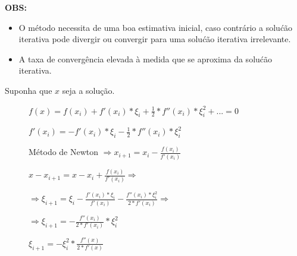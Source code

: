 \noindent
\textbf{OBS:}

\begin{itemize}
 \item O m\'etodo necessita de uma boa estimativa inicial, caso contr\'ario a solu\'c\~ao iterativa pode divergir ou convergir para uma solu\'c\~ao iterativa irrelevante.

 \item A taxa de converg\^encia elevada \`a  medida que se aproxima da solu\'c\~ao iterativa.
\end{itemize}

Suponha que $x$ seja a solução.

\begin{description}
\item[] $f(x) = f(x_{i}) + f'(x_{i}) \ast \xi_{i} + \displaystyle \frac{1}{2} \ast f''(x_{i}) \ast \xi_{i}^{2} + ... = 0$

\item[] $f'(x_{i}) = - f'(x_{i}) \ast \xi_{i} - \displaystyle \frac{1}{2} \ast f''(x_{i}) \ast \xi_{i}^{2}$

\item[] Método de Newton $\displaystyle \Rightarrow x_{i+1} = x_{i} - \frac{f(x_{i})}{f'(x_{i})} $

\item[] $\displaystyle x - x_{i+1} = x - x_{i} + \frac{f(x_{i})}{f'(x_{i})} \Rightarrow$

\item[] $\displaystyle  \Rightarrow \xi_{i+1} = \xi_{i} - \frac{f'(x_{i}) \ast \xi_{i}}{f'(x_{i})} - \frac{f''(x_{i}) \ast \xi_{i}^{2}}{2 \ast f'(x_{i})} \Rightarrow$

\item[] $\displaystyle \Rightarrow \xi_{i+1} = - \frac{f''(x_{i})}{2 \ast f'(x_{i})} \ast \xi_{i}^{2}$

\item[] $\displaystyle \xi_{i+1} = - \xi_{i}^{2} \ast \frac{f''(x)}{2 \ast f'(x)}$

\end{description}